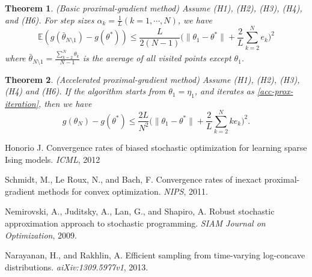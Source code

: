 \documentclass[psamsfonts]{article}
\newtheorem{thm}{Theorem} %
\theoremstyle{definition}
\theoremstyle{remark}
\numberwithin{equation} {section}
\begin{document}
\begin{thm}(Basic proximal-gradient method)
Assume (H1), (H2), (H3), (H4), and (H6). For step sizes $\alpha_k = \frac{1}{L}(k = 1, \cdots, N)$, we have
\begin{equation}\label{basic-prox-expect-bound}
\mathbb E(g(\bar{\theta}_{N\setminus 1}) - g(\theta^*)) \le \frac{L}{2(N-1)}\big(\|\theta_1 - \theta^* \| + \frac{2}{L} \sum_{k=2}^{N} e_k\big)^2
\end{equation}
where $\bar{\theta}_{N\setminus 1} = \frac{\sum_{k=2}^N \theta_k}{N-1}$ is the average of all visited points except $\theta_1$.
\end{thm}

\begin{thm}(Accelerated proximal-gradient method)
Assume (H1), (H2), (H3), (H4) and (H6). If the algorithm starts from $\theta_1 = \eta_1$, and iterates as \eqref{acc-prox-iteration}, then we have
\begin{equation}\label{acc-prox-expect-bound}
g(\theta_N) - g(\theta^*) \le \frac{2L}{N^2}\big( \|\theta_1 - \theta^* \|+ \frac{2}{L}\sum_{k=2}^{N} k e_k\big)^2.
\end{equation}
\end{thm}




\begin{thebibliography}{9}

Honorio J.
Convergence rates of biased stochastic optimization for learning sparse Ising models.
\emph{ICML}, 2012

Schmidt, M., Le Roux, N., and Bach, F.
Convergence rates of inexact proximal-gradient methods for convex optimization.
\emph{NIPS}, 2011.

Nemirovski, A., Juditsky, A., Lan, G., and Shapiro, A.
Robust stochastic approximation approach to stochastic programming.
\emph{SIAM Journal on Optimization}, 2009.

Narayanan, H., and Rakhlin, A.
Efficient sampling from time-varying log-concave distributions.
\emph{aiXiv:1309.5977v1}, 2013.

\end{thebibliography}
\end{document}
